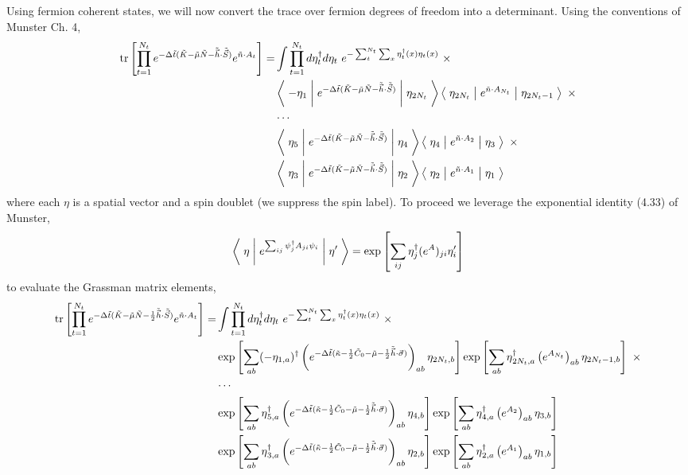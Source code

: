 Using fermion coherent states, we will now convert the trace over fermion degrees of freedom into a determinant.
Using the conventions of Munster Ch. 4,
\begin{align}
	\text{tr}\left[\prod_{t=1}^{N_t} e^{-\Delta \tilde{t}(\tilde{K} - \tilde{\mu} \tilde{N} - \tilde{\vec{h}}\cdot\tilde{\vec{S}})}  e^{ \tilde{n}\cdot A_t} \right]
	=& \int \prod_{t=1}^{N_t} d \eta^{\dagger}_t d\eta_t ~ e^{- \sum_{t}^{N_t}\sum_x \eta^{\dagger}_t(x) \eta_t(x)}~ \times
	\nonumber\\
	&
		\left\langle\; -\eta_1 \;\middle|\; e^{-\Delta \tilde{t}(\tilde{K} - \tilde{\mu}\tilde{N} - \tilde{\vec{h}}\cdot\tilde{\vec{S}}) }\;\middle|\;\eta_{2 N_t}\;\right\rangle
		\left\langle\; \eta_{2 N_t} \;\middle|\; e^{ \tilde{n} \cdot A_{N_t} } \;\middle|\;\eta_{2 N_t-1}\;\right\rangle ~ \times
	\nonumber\\
	&
		\cdots
	\nonumber\\
	&
		\left\langle\; \eta_5 \;\middle|\; e^{-\Delta \tilde{t}(\tilde{K} - \tilde{\mu}\tilde{N} - \tilde{\vec{h}}\cdot\tilde{\vec{S}}) }\;\middle|\;\eta_{4}\;\right\rangle
		\left\langle\; \eta_4 \;\middle|\; e^{ \tilde{n} \cdot A_2} \;\middle|\;\eta_3\;\right\rangle ~ \times
	\nonumber\\
	&
		\left\langle\; \eta_3 \;\middle|\; e^{-\Delta \tilde{t}(\tilde{K} - \tilde{\mu}\tilde{N} - \tilde{\vec{h}}\cdot\tilde{\vec{S}}) }\;\middle|\;\eta_{2}\;\right\rangle
		\left\langle\; \eta_2 \;\middle|\; e^{ \tilde{n} \cdot A_1} \;\middle|\;\eta_1\;\right\rangle
\end{align}
where each $\eta$ is a spatial vector and a spin doublet (we suppress the spin label).
To proceed we leverage the exponential identity (4.33) of Munster,
\begin{equation}
	\left\langle\; \eta \;\middle|\; e^{\sum_{ij} \psi^{\dagger}_j A_{ji} \psi_i} \;\middle|\; \eta' \;\right\rangle
	=
	\exp\left[ \sum_{i j} \eta^{\dagger}_j (e^A)_{ji} \eta'_i \right]
\end{equation}
to evaluate the Grassman matrix elements,
\begin{align}
	\text{tr}\left[\prod_{t=1}^{N_t} e^{-\Delta \tilde{t}(\tilde{K} - \tilde{\mu} \tilde{N} - \frac{1}{2}\tilde{\vec{h}}\cdot\tilde{\vec{S}})}  e^{ \tilde{n}\cdot A_t} \right]
	=& \int \prod_{t=1}^{N_t} d \eta^{\dagger}_t d\eta_t ~ e^{- \sum_{t}^{N_t}\sum_x \eta^{\dagger}_t(x) \eta_t(x)}~ \times
	\nonumber\\
	&
		\exp\left[ \sum_{ab} (-\eta_{1,a}){}^{\dagger} \left(e^{-\Delta \tilde{t}( \tilde{\kappa} - \frac{1}{2} \tilde{C}_0 - \tilde{\mu} - \frac{1}{2}\tilde{\vec{h}}\cdot \vec{\sigma} )}\right)_{ab} \eta_{2N_t,b} \right]
		\exp\left[ \sum_{ab} \eta{}^{\dagger}_{2N_t,a} \left(e^{A_{N_t}}\right)_{ab} \eta_{2N_t-1,b}\right] ~ \times
	\nonumber\\
	&
		\cdots
	\nonumber\\
	&
		\exp\left[ \sum_{ab} \eta{}^{\dagger}_{5,a} \left(e^{-\Delta \tilde{t}( \tilde{\kappa} -\frac{1}{2} \tilde{C}_0 - \tilde{\mu} - \frac{1}{2}\tilde{\vec{h}}\cdot \vec{\sigma} )}\right)_{ab} \eta_{4,b} \right]
		\exp\left[ \sum_{ab} \eta{}^{\dagger}_{4,a} \left(e^{A_{2}}\right)_{ab} \eta_{3,b}\right]
	\nonumber\\
	&
		\exp\left[ \sum_{ab} \eta{}^{\dagger}_{3,a} \left(e^{-\Delta \tilde{t}( \tilde{\kappa} -\frac{1}{2} \tilde{C}_0 - \tilde{\mu} - \frac{1}{2}\tilde{\vec{h}}\cdot \vec{\sigma} )}\right)_{ab} \eta_{2,b} \right]
		\exp\left[ \sum_{ab} \eta{}^{\dagger}_{2,a} \left(e^{A_{1}}\right)_{ab} \eta_{1,b}\right]
\end{align}
